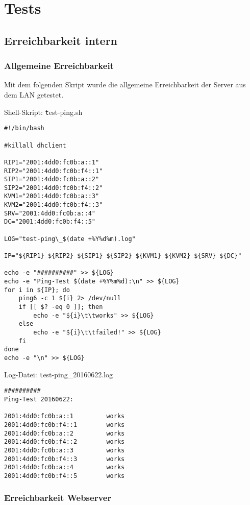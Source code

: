 \section{Tests}

\subsection{Erreichbarkeit intern}

\subsubsection{Allgemeine Erreichbarkeit}

Mit dem folgenden Skript wurde die allgemeine Erreichbarkeit der Server aus dem LAN getestet.\newline

Shell-Skript: {\texttt test-ping.sh}
\begin{lstlisting}
#!/bin/bash

#killall dhclient

RIP1="2001:4dd0:fc0b:a::1"
RIP2="2001:4dd0:fc0b:f4::1"
SIP1="2001:4dd0:fc0b:a::2"
SIP2="2001:4dd0:fc0b:f4::2"
KVM1="2001:4dd0:fc0b:a::3"
KVM2="2001:4dd0:fc0b:f4::3"
SRV="2001:4dd0:fc0b:a::4"
DC="2001:4dd0:fc0b:f4::5"

LOG="test-ping\_$(date +%Y%d%m).log"

IP="${RIP1} ${RIP2} ${SIP1} ${SIP2} ${KVM1} ${KVM2} ${SRV} ${DC}"

echo -e "##########" >> ${LOG}
echo -e "Ping-Test $(date +%Y%m%d):\n" >> ${LOG}
for i in ${IP}; do
	ping6 -c 1 ${i} 2> /dev/null
	if [[ $? -eq 0 ]]; then
		echo -e "${i}\t\tworks" >> ${LOG}
	else
		echo -e "${i}\t\tfailed!" >> ${LOG}
	fi
done	
echo -e "\n" >> ${LOG}
\end{lstlisting}

Log-Datei: {\texttt test-ping\_20160622.log}
\begin{lstlisting}
##########
Ping-Test 20160622:

2001:4dd0:fc0b:a::1			works
2001:4dd0:fc0b:f4::1		works
2001:4dd0:fc0b:a::2			works
2001:4dd0:fc0b:f4::2		works
2001:4dd0:fc0b:a::3			works
2001:4dd0:fc0b:f4::3		works
2001:4dd0:fc0b:a::4			works
2001:4dd0:fc0b:f4::5		works
\end{lstlisting}

\newpage	
\subsubsection{Erreichbarkeit Webserver}

